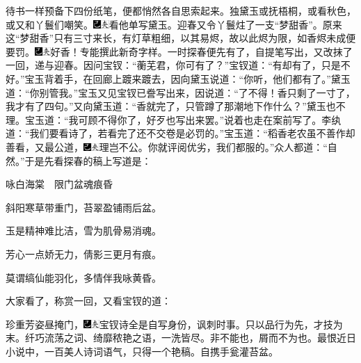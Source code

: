待书一样预备下四份纸笔，便都悄然各自思索起来。独黛玉或抚梧桐，或看秋色，或又和丫鬟们嘲笑。{\includegraphics[width=3mm]{../Images/00003}\includegraphics[width=3mm]{../Images/00012}\footnotesize \kaishu 看他单写黛玉。}迎春又令丫鬟炷了一支``梦甜香''。原来这``梦甜香''只有三寸来长，有灯草粗细，以其易烬，故以此烬为限，如香烬未成便要罚。{\includegraphics[width=3mm]{../Images/00003}\includegraphics[width=3mm]{../Images/00012}\footnotesize \kaishu 好香！专能撰此新奇字样。}一时探春便先有了，自提笔写出，又改抹了一回，递与迎春。因问宝钗：``蘅芜君，你可有了？''宝钗道：``有却有了，只是不好。''宝玉背着手，在回廊上踱来踱去，因向黛玉说道：``你听，他们都有了。''黛玉道：``你别管我。''宝玉又见宝钗已誊写出来，因说道：``了不得！香只剩了一寸了，我才有了四句。''又向黛玉道：``香就完了，只管蹲了那潮地下作什么？''黛玉也不理。宝玉道：``我可顾不得你了，好歹也写出来罢。''说着也走在案前写了。李纨道：``我们要看诗了，若看完了还不交卷是必罚的。''宝玉道：``稻香老农虽不善作却善看，又最公道，{\includegraphics[width=3mm]{../Images/00003}\includegraphics[width=3mm]{../Images/00012}\footnotesize \kaishu 理岂不公。}你就评阅优劣，我们都服的。''众人都道：``自然。''于是先看探春的稿上写道是：

咏白海棠　{限门盆魂痕昏}

斜阳寒草带重门，苔翠盈铺雨后盆。

玉是精神难比洁，雪为肌骨易消魂。

芳心一点娇无力，倩影三更月有痕。

莫谓缟仙能羽化，多情伴我咏黄昏。

大家看了，称赏一回，又看宝钗的道：

珍重芳姿昼掩门，{{\includegraphics[width=3mm]{../Images/00003}\includegraphics[width=3mm]{../Images/00012}\footnotesize \kaishu 宝钗诗全是自写身份，讽刺时事。只以品行为先，才技为末。纤巧流荡之词、绮靡}秾{艳之语，一洗皆尽。非不能也，屑而不为也。最恨近日小说中，一百美人诗词语气，只得一个艳稿。}}自携手瓮灌苔盆。

